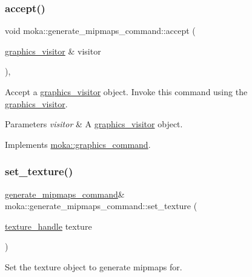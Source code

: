 \subsubsection{\texorpdfstring{accept()}{accept()}}
{\footnotesize\ttfamily void moka\+::generate\+\_\+mipmaps\+\_\+command\+::accept (\begin{DoxyParamCaption}\item[{\mbox{\hyperlink{classmoka_1_1graphics__visitor}{graphics\+\_\+visitor}} \&}]{visitor }\end{DoxyParamCaption})\hspace{0.3cm}{\ttfamily [override]}, {\ttfamily [virtual]}}



Accept a \mbox{\hyperlink{classmoka_1_1graphics__visitor}{graphics\+\_\+visitor}} object. Invoke this command using the \mbox{\hyperlink{classmoka_1_1graphics__visitor}{graphics\+\_\+visitor}}. 


\begin{DoxyParams}{Parameters}
{\em visitor} & A \mbox{\hyperlink{classmoka_1_1graphics__visitor}{graphics\+\_\+visitor}} object. \\
\hline
\end{DoxyParams}


Implements \mbox{\hyperlink{classmoka_1_1graphics__command_a7affaeceb1019ab358c62185bce4e654}{moka\+::graphics\+\_\+command}}.

\mbox{\label{classmoka_1_1generate__mipmaps__command_add1aa61412ba9424f727f5a536e5be06}} 
\subsubsection{\texorpdfstring{set\_texture()}{set\_texture()}}
{\footnotesize\ttfamily \mbox{\hyperlink{classmoka_1_1generate__mipmaps__command}{generate\+\_\+mipmaps\+\_\+command}}\& moka\+::generate\+\_\+mipmaps\+\_\+command\+::set\+\_\+texture (\begin{DoxyParamCaption}\item[{\mbox{\hyperlink{structmoka_1_1texture__handle}{texture\+\_\+handle}}}]{texture }\end{DoxyParamCaption})}



Set the texture object to generate mipmaps for. 


